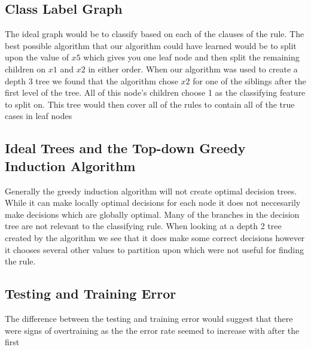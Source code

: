 \documentclass[12pt,letterpaper]{article}
\begin{document}

\subsection{Class Label Graph}
The ideal graph would be to classify based on each of the clauses of the rule.  The best possible algorithm that our algorithm could have learned would be to split upon the value of $x5$ which gives you one leaf node and then split the remaining children on $x1$ and $x2$ in either order.  When our algorithm was used to create a depth 3 tree we found that the algorithm chose $x2$ for one of the siblings after the first level of the tree.  All of this node's children choose 1 as the classifying feature to split on.  This tree would then cover all of the rules to contain all of the true cases in leaf nodes 
 
\subsection{Ideal Trees and the Top-down Greedy Induction Algorithm}
Generally the greedy induction algorithm will not create optimal decision trees.  While it can make locally optimal decisions for each node it does not neccesarily make decisions which are globally optimal.  Many of the branches in the decision tree are not relevant to the classifying rule.  When looking at a depth 2 tree created by the algorithm we see that it does make some correct decisions however it chooses several other values to partition upon which were not useful for finding the rule.  

\subsection{Testing and Training Error}
The difference between the testing and training error would suggest that there were signs of overtraining as the the error rate seemed to increase with after the first 
 
\end{document}
